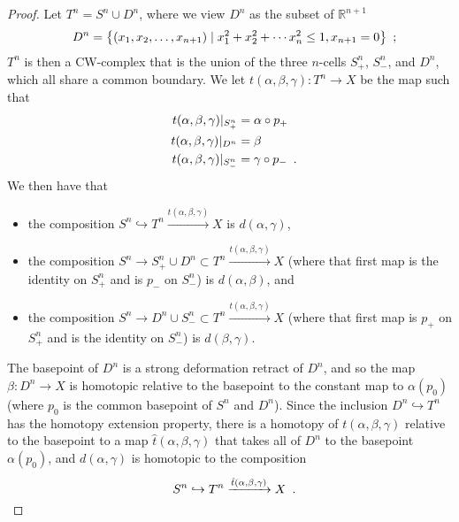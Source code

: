 \documentclass[12pt]{amsart}
\numberwithin{equation}{section}
\theoremstyle{slplain}
\theoremstyle{definition}
\theoremstyle{remark}
\newcommand{\R}{\mathbb{R}}
\newcommand{\suchthat}{\mid}
\newcommand{\rest}[1]{|_{#1}}
\newcommand{\Period}{\rlap{\enspace .}}
\newcommand{\Semicolon}{\rlap{\enspace ;}}
\begin{document}
\begin{proof}
  Let $T^{n} = S^{n} \cup D^{n}$, where we view $D^{n}$ as the subset
  of $\R^{n+1}$
  \begin{displaymath}
    D^{n} = \bigl\{ (x_{1}, x_{2}, \ldots, x_{n+1}) \suchthat
    x_{1}^{2} + x_{2}^{2} + \cdots x_{n}^{2} \le 1,
    x_{n+1} = 0 \bigr\} \Semicolon
  \end{displaymath}
  $T^{n}$ is then a CW-complex that is the union of the three
  $n$-cells $S^{n}_{+}$, $S^{n}_{-}$, and $D^{n}$, which all share a
  common boundary.  We let $t(\alpha,\beta,\gamma)\colon T^{n} \to X$
  be the map such that
  \begin{align*}
    t(\alpha,\beta,\gamma)\rest{S^{n}_{+}} &= \alpha \circ p_{+}\\
    t(\alpha,\beta,\gamma)\rest{D^{n}} &= \beta\\
    t(\alpha,\beta,\gamma)\rest{S^{n}_{-}} &= \gamma \circ p_{-}
    \Period
  \end{align*}
  We then have that
  \begin{itemize}
  \item the composition $S^{n} \hookrightarrow T^{n}
    \xrightarrow{t(\alpha,\beta,\gamma)} X$ is $d(\alpha,\gamma)$,
  \item the composition $S^{n} \to S^{n}_{+} \cup D^{n} \subset T^{n}
    \xrightarrow{t(\alpha,\beta,\gamma)} X$ (where that first map is
    the identity on $S^{n}_{+}$ and is $p_{-}$ on $S^{n}_{-}$) is
    $d(\alpha,\beta)$, and
  \item the composition $S^{n} \to D^{n} \cup S^{n}_{-} \subset T^{n}
    \xrightarrow{t(\alpha,\beta,\gamma)} X$ (where that first map is
    $p_{+}$ on $S^{n}_{+}$ and is the identity on $S^{n}_{-}$) is
    $d(\beta,\gamma)$.
  \end{itemize}

  The basepoint of $D^{n}$ is a strong deformation retract of $D^{n}$,
  and so the map $\beta\colon D^{n} \to X$ is homotopic relative to
  the basepoint to the constant map to $\alpha(p_{0})$ (where $p_{0}$
  is the common basepoint of $S^{n}$ and $D^{n}$).  Since the
  inclusion $D^{n} \hookrightarrow T^{n}$ has the homotopy extension
  property, there is a homotopy of $t(\alpha,\beta,\gamma)$ relative
  to the basepoint to a map $\hat t(\alpha,\beta,\gamma)$ that takes
  all of $D^{n}$ to the basepoint $\alpha(p_{0})$, and
  $d(\alpha,\gamma)$ is homotopic to the composition
  \begin{displaymath}
    S^{n} \hookrightarrow T^{n}
    \xrightarrow{\hat t(\alpha,\beta,\gamma)} X \Period
  \end{displaymath}


\end{proof}
\end{document}
